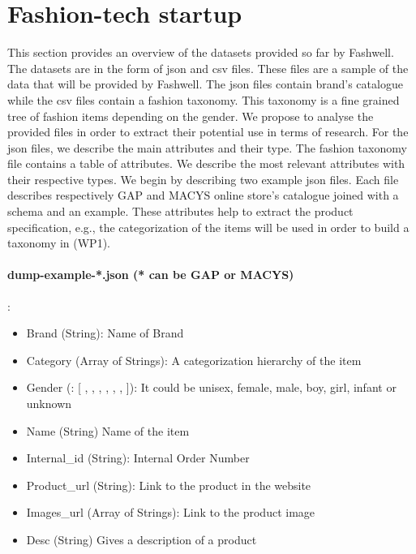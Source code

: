 \section{Fashion-tech startup}

This section provides an overview of the datasets provided so far by Fashwell. The datasets are in the form of json and csv files. These files are a sample of the data that will be provided by Fashwell. The json files contain brand’s catalogue while the csv files contain a fashion taxonomy. This taxonomy is a fine grained tree of fashion items depending on the gender. We propose to analyse the provided files in order to extract their potential use in terms of research. For the json files, we describe the main attributes and their type. The fashion taxonomy file contains a table of attributes. We describe the most relevant attributes with their respective types. 
We begin by describing two example json files. Each file describes respectively GAP and MACYS online store’s catalogue joined with a schema and an example. These attributes help to extract the product specification, e.g., the categorization of the items will be used in order to build a taxonomy in (WP1).

\paragraph*{dump-example-*.json (* can be GAP or MACYS)}:

\begin{itemize}
    \item Brand (String): Name of Brand
    \item Category (Array of Strings): A categorization hierarchy of the item
    \item Gender (: [ , ,  , , , ,  ]): It could be unisex, female, male, boy, girl, infant or unknown 
    \item Name (String) Name of the item
    \item Internal\_id (String): Internal Order Number
    \item Product\_url (String): Link to the product in the website
    \item Images\_url (Array of Strings): Link to the product image
    \item Desc (String) Gives a description of a product
\end{itemize}

